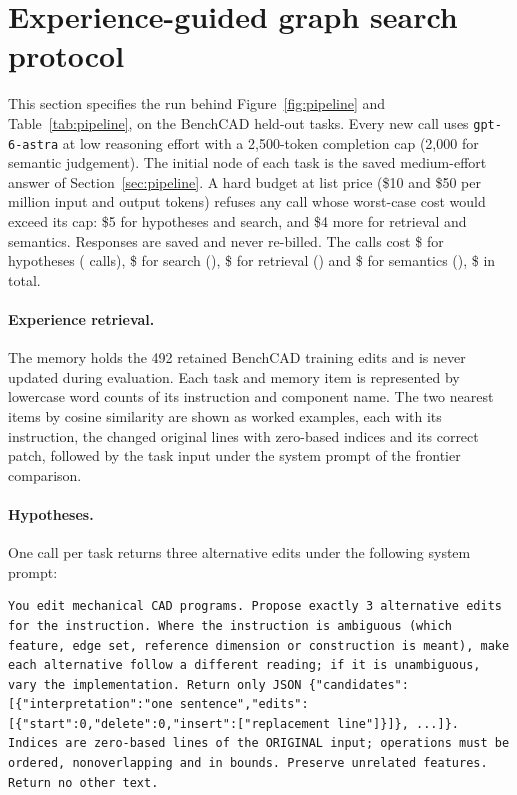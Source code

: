 \section{Experience-guided graph search protocol}
\label{sec:pipeline-protocol}
This section specifies the run behind Figure~\ref{fig:pipeline} and Table~\ref{tab:pipeline}, on the \pipeN{} BenchCAD held-out tasks. Every new call uses \texttt{gpt-6-astra} at low reasoning effort with a 2,500-token completion cap (2,000 for semantic judgement). The initial node of each task is the saved medium-effort answer of Section~\ref{sec:pipeline}. A hard budget at list price (\$10 and \$50 per million input and output tokens) refuses any call whose worst-case cost would exceed its cap: \$5 for hypotheses and search, and \$4 more for retrieval and semantics. Responses are saved and never re-billed. The calls cost \$\pipeBranchCost{} for hypotheses (\pipeBranchCalls{} calls), \$\pipeMctsCost{} for search (\pipeMctsCalls), \$\pipeRagCost{} for retrieval (\pipeRagCalls) and \$\pipeSemanticCost{} for semantics (\pipeSemanticCalls), \$\pipeCost{} in total.

\paragraph{Experience retrieval.}
The memory holds the 492 retained BenchCAD training edits and is never updated during evaluation. Each task and memory item is represented by lowercase word counts of its instruction and component name. The two nearest items by cosine similarity are shown as worked examples, each with its instruction, the changed original lines with zero-based indices and its correct patch, followed by the task input under the system prompt of the frontier comparison.

\paragraph{Hypotheses.}
One call per task returns three alternative edits under the following system prompt:
\begin{lstlisting}
You edit mechanical CAD programs. Propose exactly 3 alternative edits for the instruction. Where the instruction is ambiguous (which feature, edge set, reference dimension or construction is meant), make each alternative follow a different reading; if it is unambiguous, vary the implementation. Return only JSON {"candidates":[{"interpretation":"one sentence","edits":[{"start":0,"delete":0,"insert":["replacement line"]}]}, ...]}. Indices are zero-based lines of the ORIGINAL input; operations must be ordered, nonoverlapping and in bounds. Preserve unrelated features. Return no other text.
\end{lstlisting}

